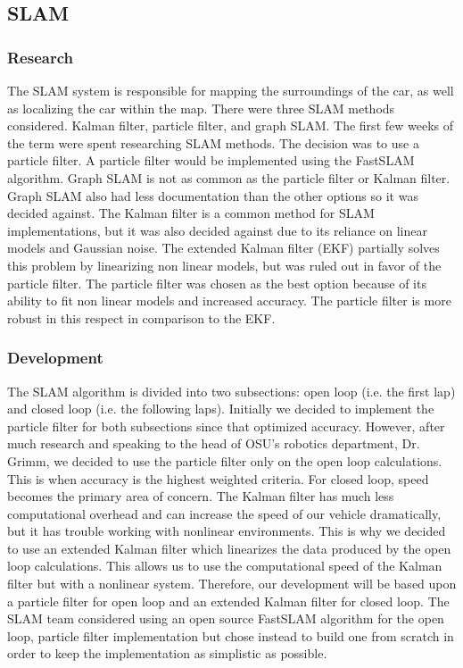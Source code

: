 \documentclass[10pt, onecolumn, draftclsnofoot, letterpaper,compsoc]{IEEEtran}
\begin{document}
\subsection{SLAM}
\subsubsection{Research}
The SLAM system is responsible for mapping the surroundings of the car, as well as localizing the car within the map. There were three SLAM methods considered. Kalman filter, particle filter, and graph SLAM. The first few weeks of the term were spent researching SLAM methods. The decision was to use a particle filter. A particle filter would be implemented using the FastSLAM algorithm. Graph SLAM is not as common as the particle filter or Kalman filter. Graph SLAM also had less documentation than the other options so it was decided against. The Kalman filter is a common method for SLAM implementations, but it was also decided against due to its reliance on linear models and Gaussian noise. The extended Kalman filter (EKF) partially solves this problem by linearizing non linear models, but was ruled out in favor of the particle filter. The particle filter was chosen as the best option because of its ability to fit non linear models and increased accuracy. The particle filter is more robust in this respect in comparison to the EKF. 
\subsubsection{Development}
The SLAM algorithm is divided into two subsections: open loop (i.e. the first lap) and closed loop (i.e. the following laps). Initially we decided to implement the particle filter for both subsections since that optimized accuracy. However, after much research and speaking to the head of OSU's robotics department, Dr. Grimm, we decided to use the particle filter only on the open loop calculations. This is when accuracy is the highest weighted criteria. For closed loop, speed becomes the primary area of concern. The Kalman filter has much less computational overhead and can increase the speed of our vehicle dramatically, but it has trouble working with nonlinear environments. This is why we decided to use an extended Kalman filter which linearizes the data produced by the open loop calculations. This allows us to use the computational speed of the Kalman filter but with a nonlinear system. \newline
Therefore, our development will be based upon a particle filter for open loop and an extended Kalman filter for closed loop. The SLAM team considered using an open source FastSLAM algorithm for the open loop, particle filter implementation but chose instead to build one from scratch in order to keep the implementation as simplistic as possible.
\end{document}
